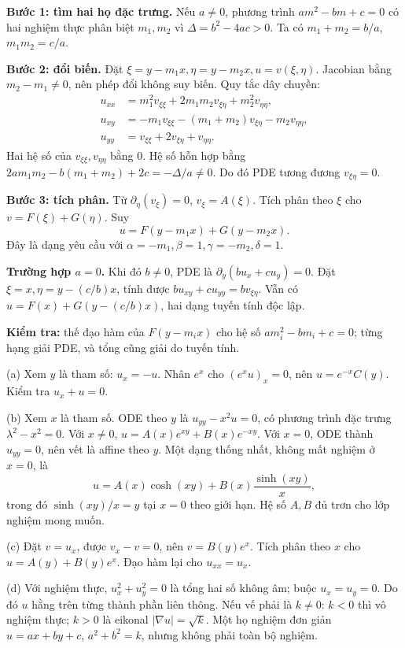 \textbf{Bước 1: tìm hai họ đặc trưng.} Nếu $a\ne0$, phương trình $am^2-bm+c=0$ có hai nghiệm thực phân biệt $m_1,m_2$ vì $\Delta=b^2-4ac>0$. Ta có $m_1+m_2=b/a$, $m_1m_2=c/a$.

\textbf{Bước 2: đổi biến.} Đặt $\xi=y-m_1x,\eta=y-m_2x,u=v(\xi,\eta)$. Jacobian bằng $m_2-m_1\ne0$, nên phép đổi không suy biến. Quy tắc dây chuyền:
\begin{align*}
u_{xx}&=m_1^2v_{\xi\xi}+2m_1m_2v_{\xi\eta}+m_2^2v_{\eta\eta},\\
u_{xy}&=-m_1v_{\xi\xi}-(m_1+m_2)v_{\xi\eta}-m_2v_{\eta\eta},\\
u_{yy}&=v_{\xi\xi}+2v_{\xi\eta}+v_{\eta\eta}.
\end{align*}
Hai hệ số của $v_{\xi\xi},v_{\eta\eta}$ bằng 0. Hệ số hỗn hợp bằng $2am_1m_2-b(m_1+m_2)+2c=-\Delta/a\ne0$. Do đó PDE tương đương $v_{\xi\eta}=0$.

\textbf{Bước 3: tích phân.} Từ $\partial_\eta(v_\xi)=0$, $v_\xi=A(\xi)$. Tích phân theo $\xi$ cho $v=F(\xi)+G(\eta)$. Suy
\[\boxed{u=F(y-m_1x)+G(y-m_2x).}\]
Đây là dạng yêu cầu với $\alpha=-m_1,\beta=1,\gamma=-m_2,\delta=1$.

\textbf{Trường hợp $a=0$.} Khi đó $b\ne0$, PDE là $\partial_y(bu_x+cu_y)=0$. Đặt $\xi=x,\eta=y-(c/b)x$, tính được $bu_{xy}+cu_{yy}=b v_{\xi\eta}$. Vẫn có $u=F(x)+G(y-(c/b)x)$, hai dạng tuyến tính độc lập.

\textbf{Kiểm tra:} thế đạo hàm của $F(y-m_ix)$ cho hệ số $am_i^2-bm_i+c=0$; từng hạng giải PDE, và tổng cũng giải do tuyến tính.

(a) Xem $y$ là tham số: $u_x=-u$. Nhân $e^x$ cho $(e^xu)_x=0$, nên $u=e^{-x}C(y)$. Kiểm tra $u_x+u=0$.

(b) Xem $x$ là tham số. ODE theo $y$ là $u_{yy}-x^2u=0$, có phương trình đặc trưng $\lambda^2-x^2=0$. Với $x\ne0$, $u=A(x)e^{xy}+B(x)e^{-xy}$. Với $x=0$, ODE thành $u_{yy}=0$, nên vết là affine theo $y$. Một dạng thống nhất, không mất nghiệm ở $x=0$, là
\[u=A(x)\cosh(xy)+B(x)\frac{\sinh(xy)}x,\]
trong đó $\sinh(xy)/x=y$ tại $x=0$ theo giới hạn. Hệ số $A,B$ đủ trơn cho lớp nghiệm mong muốn.

(c) Đặt $v=u_x$, được $v_x-v=0$, nên $v=B(y)e^x$. Tích phân theo $x$ cho $u=A(y)+B(y)e^x$. Đạo hàm lại cho $u_{xx}=u_x$.

(d) Với nghiệm thực, $u_x^2+u_y^2=0$ là tổng hai số không âm; buộc $u_x=u_y=0$. Do đó $u$ hằng trên từng thành phần liên thông. Nếu vế phải là $k\ne0$: $k<0$ thì vô nghiệm thực; $k>0$ là eikonal $|\nabla u|=\sqrt k$. Một họ nghiệm đơn giản $u=ax+by+c$, $a^2+b^2=k$, nhưng không phải toàn bộ nghiệm.

